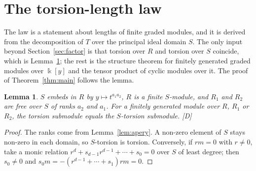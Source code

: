 \documentclass[11pt]{article}
\newtheorem{lemma}[theorem]{Lemma}
\theoremstyle{definition}
\theoremstyle{remark}
\newcommand{\kk}{\Bbbk}
\newcommand{\mD}{\emph{[D]}}
\begin{document}
\section{The torsion-length law}\label{sec:length}

The law is a statement about lengths of finite graded modules, and it is derived from the decomposition of $T$ over the principal ideal domain $S$.
The only input beyond Section~\ref{sec:factor} is that torsion over $R$ and torsion over $S$ coincide, which is Lemma~\ref{lem:torsion}; the rest is the structure theorem
for finitely generated graded modules over $\kk[y]$ and the tensor product of cyclic modules over it. The proof of Theorem~\ref{thm:main} follows the lemma.

\begin{lemma}\label{lem:torsion}
$S$ embeds in $R$ by $y\mapsto t^{a_1a_2}$, $R$ is a finite $S$-module, and $R_1$ and $R_2$ are free over
$S$ of ranks $a_2$ and $a_1$. For a finitely generated module over $R$, $R_1$ or $R_2$, the torsion
submodule equals the $S$-torsion submodule. \mD{}
\end{lemma}

\begin{proof}
The ranks come from Lemma~\ref{lem:apery}. A non-zero element of $S$ stays non-zero in each domain, so
$S$-torsion is torsion. Conversely, if $rm=0$ with $r\ne0$, take a monic relation
$r^d+s_{d-1}r^{d-1}+\cdots+s_0=0$ over $S$ of least degree; then $s_0\ne0$ and
$s_0m=-(r^{d-1}+\cdots+s_1)rm=0$.
\end{proof}
\end{document}
